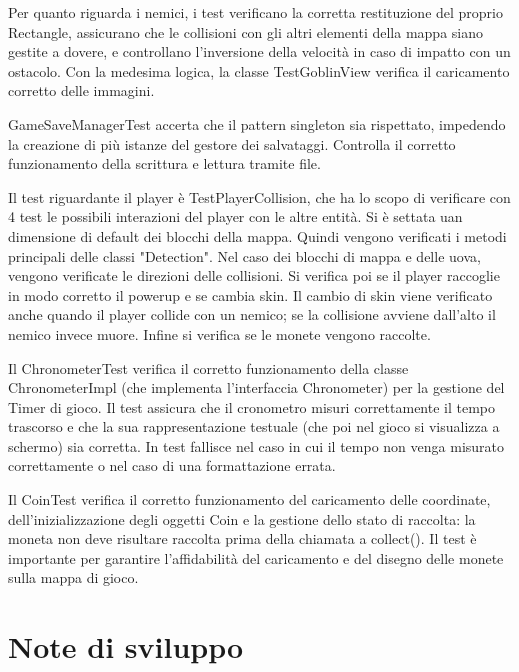 \documentclass[a4paper,12pt]{report}
\begin{document}
Per quanto riguarda i nemici, i test verificano la corretta restituzione del proprio Rectangle, assicurano che le collisioni con gli
altri elementi della mappa siano gestite a dovere, e controllano l'inversione della velocità in caso di impatto con un ostacolo.
Con la medesima logica, la classe TestGoblinView verifica il caricamento corretto delle immagini.

GameSaveManagerTest accerta che il pattern singleton sia rispettato, impedendo la creazione di più istanze del gestore dei 
salvataggi. Controlla il corretto funzionamento della scrittura e lettura tramite file.

Il test riguardante il player è TestPlayerCollision, che ha lo scopo di verificare con 4 test le possibili interazioni del player con
le altre entità. Si è settata uan dimensione di default dei blocchi della mappa.
Quindi vengono verificati i metodi principali delle classi "Detection". Nel caso dei blocchi di mappa e delle uova,
vengono verificate le direzioni delle collisioni. Si verifica poi se il player raccoglie in modo corretto il powerup e se cambia skin.
Il cambio di skin viene verificato anche quando il player collide con un nemico; se la collisione avviene dall'alto il nemico 
invece muore. Infine si verifica se le monete vengono raccolte.

Il ChronometerTest verifica il corretto funzionamento della classe ChronometerImpl (che implementa l'interfaccia Chronometer) per la
gestione del Timer di gioco. Il test assicura che il cronometro misuri correttamente il tempo trascorso e che la sua rappresentazione 
testuale (che poi nel gioco si visualizza a schermo) sia corretta. In test fallisce nel caso in cui il tempo non venga misurato 
correttamente o nel caso di una formattazione errata.

Il CoinTest verifica il corretto funzionamento del caricamento delle coordinate, dell'inizializzazione degli oggetti Coin e la gestione 
dello stato di raccolta: la moneta non deve risultare raccolta prima della chiamata a collect(). Il test è importante per garantire l'affidabilità 
del caricamento e del disegno delle monete sulla mappa di gioco.


\section{Note di sviluppo}
\end{document}
